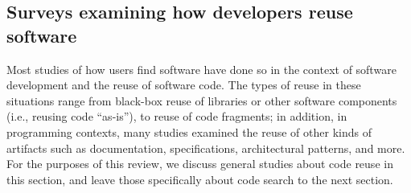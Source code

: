 \documentclass{casicswhitepaper}
\begin{document}
\subsection{Surveys examining how developers reuse software}


Most studies of how users find software have done so in the context of software development and the reuse of software code.  The types of reuse in these situations range from black-box reuse of libraries or other software components (i.e., reusing code ``as-is''), to reuse of code fragments; in addition, in programming contexts, many studies examined the reuse of other kinds of artifacts such as documentation, specifications, architectural patterns, and more.  For the purposes of this review, we discuss general studies about code reuse in this section, and leave those specifically about code search to the next section.
\end{document}
